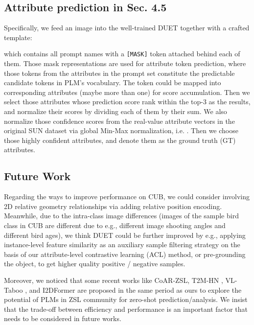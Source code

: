 \documentclass[letterpaper]{article} \usepackage{aaai23}  \usepackage{times}  \usepackage{helvet}  \usepackage{courier}  \usepackage[hyphens]{url}  \usepackage{graphicx} \urlstyle{rm} \def\UrlFont{\rm}  \usepackage{natbib}  \usepackage{caption} \frenchspacing  \setlength{\pdfpagewidth}{8.5in}  \setlength{\pdfpageheight}{11in}  \usepackage{algorithm}
\begin{document}
\subsection{Attribute prediction in Sec. 4.5}\label{apd:ap}
Specifically, we feed an image into the well-trained DUET together with a crafted template:

which contains all prompt names  with a {\tt [MASK]} token   attached behind each of them.
Those mask representations are used for attribute  token prediction, where those tokens from the attributes in {the prompt set} 
constitute the  predictable candidate tokens in PLM's vocabulary.
The token could be mapped into corresponding attributes (maybe more than one) for score accumulation.
Then we select those attributes whose prediction score rank within  the top-3  as the  results, and normalize  their scores 
by dividing each of them by their {sum.}
We also normalize those confidence score{s} from the real-value attribute vectors in {the} original SUN dataset via global Min-Max normalization, i.e. .
Then we choose those highly confident attributes, and denote them as the ground truth (GT)  attributes.

\subsection{Future Work}
Regarding the ways to improve performance on CUB, we could consider involving 2D relative geometry relationships via adding relative position encoding. Meanwhile, due to the intra-class image differences (images of the sample bird class in CUB are different due to e.g., different image shooting angles and different bird ages), we think DUET could be further improved by e.g., applying instance-level feature similarity as an auxiliary sample filtering strategy on the basis of our attribute-level contrastive learning (ACL) method, or pre-grounding the object, to get higher quality positive / negative samples.

Moreover, we noticed that some recent works like CoAR-ZSL\cite{DBLP:journals/corr/abs-2207-03824},  T2M-HN \cite{DBLP:journals/corr/abs-2210-15182}, VL-Taboo \cite{DBLP:journals/corr/abs-2209-06103}, and I2DFormer \cite{DBLP:journals/corr/abs-2209-10304} are proposed in the same period as ours to explore the potential of PLMs in ZSL community for zero-shot prediction/analysis. 
We insist that the trade-off between efficiency and performance is an important factor that needs to be considered in future works.
\end{document}
